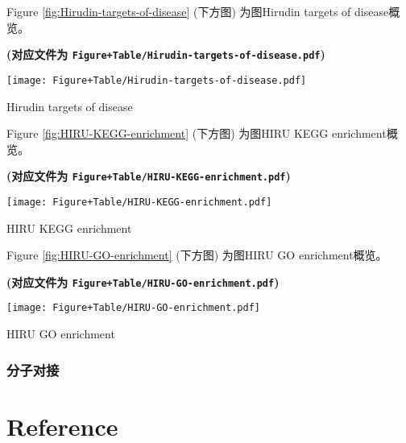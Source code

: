 \documentclass[
]{article}
\begin{document}
Figure \ref{fig:Hirudin-targets-of-disease} (下方图) 为图Hirudin targets of disease概览。

\textbf{(对应文件为 \texttt{Figure+Table/Hirudin-targets-of-disease.pdf})}

\def\@captype{figure}
\begin{center}
\texttt{[image: Figure+Table/Hirudin-targets-of-disease.pdf]}
\caption{Hirudin targets of disease}\label{fig:Hirudin-targets-of-disease}
\end{center}

Figure \ref{fig:HIRU-KEGG-enrichment} (下方图) 为图HIRU KEGG enrichment概览。

\textbf{(对应文件为 \texttt{Figure+Table/HIRU-KEGG-enrichment.pdf})}

\def\@captype{figure}
\begin{center}
\texttt{[image: Figure+Table/HIRU-KEGG-enrichment.pdf]}
\caption{HIRU KEGG enrichment}\label{fig:HIRU-KEGG-enrichment}
\end{center}

Figure \ref{fig:HIRU-GO-enrichment} (下方图) 为图HIRU GO enrichment概览。

\textbf{(对应文件为 \texttt{Figure+Table/HIRU-GO-enrichment.pdf})}

\def\@captype{figure}
\begin{center}
\texttt{[image: Figure+Table/HIRU-GO-enrichment.pdf]}
\caption{HIRU GO enrichment}\label{fig:HIRU-GO-enrichment}
\end{center}

\hypertarget{ux5206ux5b50ux5bf9ux63a5}{%
\subsubsection{分子对接}\label{ux5206ux5b50ux5bf9ux63a5}}

\hypertarget{bibliography}{%
\section*{Reference}\label{bibliography}}
\end{document}
